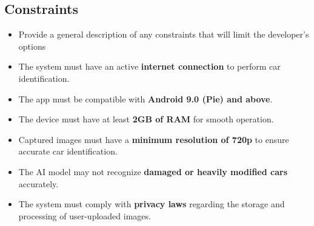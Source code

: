 \documentclass[]{article}
\begin{document}
\subsection{Constraints}
\label{sub:constraints}
\begin{itemize}
	\item Provide a general description of any constraints that will limit the developer's options
	
	\item The system must have an active \textbf{internet connection} to perform car identification.
    \item The app must be compatible with \textbf{Android 9.0 (Pie) and above}.
    \item The device must have at least \textbf{2GB of RAM} for smooth operation.
    \item Captured images must have a \textbf{minimum resolution of 720p} to ensure accurate car identification.
    \item The AI model may not recognize \textbf{damaged or heavily modified cars} accurately.
    \item The system must comply with \textbf{privacy laws} regarding the storage and processing of user-uploaded images.

\end{itemize}
\end{document}
